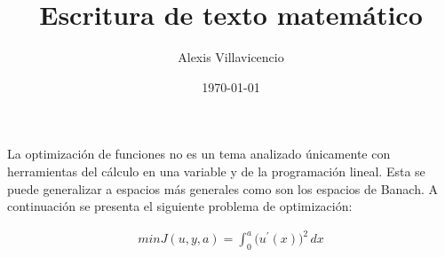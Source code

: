 \documentclass[a4paper,12pt]{article}
\title{Escritura de texto matemático}
\author{Alexis Villavicencio}
\date{\today}
\begin{document}
\maketitle
La optimización de funciones no es un tema analizado únicamente con herramientas del cálculo en
una variable y de la programación lineal. Esta se puede generalizar a espacios más generales como
son los espacios de Banach. A continuación se presenta el siguiente problema de optimización:

\begin{align}
   minJ(u,y,a)= \int_{0}^{a} \big(u^{'}(x)\big)^{2} \, dx
\end{align}
\end{document}
